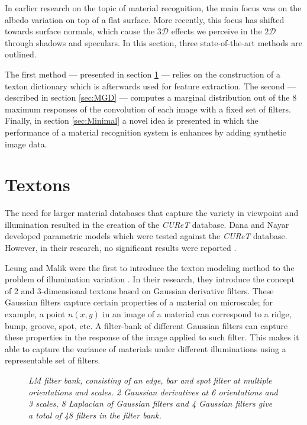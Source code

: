 \hypertarget{RelatedWork}{
}
In earlier research on the topic of material recognition, the main focus was on the albedo variation on top of a flat surface. More recently, this focus has shifted towards surface normals, which cause the $3\mathcal{D}$ effects we perceive in the $2\mathcal{D}$ through shadows and speculars. In this section, three state-of-the-art methods are outlined.

The first method --- presented in section \ref{sec:Textons} --- relies on the construction of a texton dictionary which is afterwards used for feature extraction. The second --- described in section \ref{sec:MGD} --- computes a marginal distribution out of the 8 maximum responses of the convolution of each image with a fixed set of filters. Finally, in section \ref{sec:Minimal} a novel idea is presented in which the performance of a material recognition system is enhances by adding synthetic image data.


\section{Textons}\label{sec:Textons}

The need for larger material databases that capture the variety in viewpoint and illumination resulted in the creation of the {\it CUReT} database. Dana and Nayar \cite{DanaNayar} developed parametric models  which were tested against the {\it CUReT} database. However, in their research, no significant results were reported \cite{VarmaZisserman}.

Leung and Malik were the first to introduce the texton modeling method to the problem of illumination variation \cite{LeungMalik}. In their research, they introduce the concept of 2 and 3-dimensional textons based on Gaussian derivative filters. These Gaussian filters capture certain properties of a material on microscale; for example, a point $n(x,y)$ in an image of a material can correspond to a ridge, bump, groove, spot, etc. A filter-bank of different Gaussian filters can capture these properties in the response of the image applied to such filter. This makes it able to capture the variance of materials under different illuminations using a representable set of filters.

\begin{figure}[b]
	\begin{center}
	\end{center}
	\caption{\textit{LM filter bank, consisting of an edge, bar and spot filter at multiple orientations and scales. 2 Gaussian derivatives at 6 orientations and 3 scales, 8 Laplacian of Gaussian filters and 4 Gaussian filters give a total of 48 filters in the filter bank.}}
	\label{fig:LM}
\end{figure}


